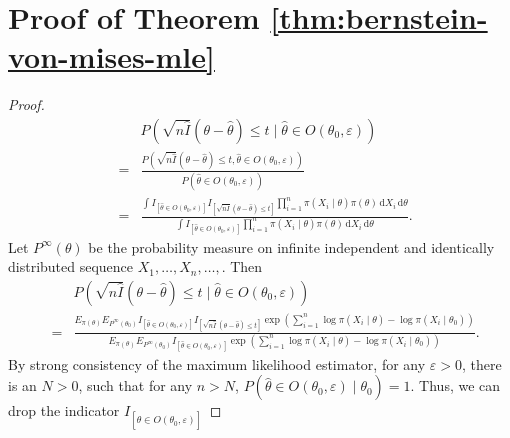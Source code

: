 \documentclass[oneside,english]{amsbook}
\numberwithin{section}{chapter}
\numberwithin{equation}{section}
\numberwithin{figure}{section}
\theoremstyle{plain}
\theoremstyle{plain}
\theoremstyle{definition}
\theoremstyle{plain}
\theoremstyle{plain}
\theoremstyle{remark}
\theoremstyle{definition}
\theoremstyle{definition}
\newcommand{\diff}{\,\mathrm{d}}
\begin{document}
\section{\label{sec:proof-thm-1}Proof of Theorem \ref{thm:bernstein-von-mises-mle}}
\begin{proof}
\begin{eqnarray*}
 &  & P\left(\sqrt{n\hat{I}}\left(\theta-\hat{\theta}\right)\le t\mid\hat{\theta}\in O\left(\theta_{0},\varepsilon\right)\right)\\
 & = & \frac{P\left(\sqrt{n\hat{I}}\left(\theta-\hat{\theta}\right)\le t,\hat{\theta}\in O\left(\theta_{0},\varepsilon\right)\right)}{P\left(\hat{\theta}\in O\left(\theta_{0},\varepsilon\right)\right)}\\
 & = & \frac{\int I_{\left[\hat{\theta}\in O\left(\theta_{0},\varepsilon\right)\right]}I_{\left[\sqrt{n\hat{I}}\left(\theta-\hat{\theta}\right)\le t\right]}\prod_{i=1}^{n}\pi\left(X_{i}\mid\theta\right)\pi\left(\theta\right)\diff X_{i}\diff\theta}{\int I_{\left[\hat{\theta}\in O\left(\theta_{0},\varepsilon\right)\right]}\prod_{i=1}^{n}\pi\left(X_{i}\mid\theta\right)\pi\left(\theta\right)\diff X_{i}\diff\theta}.
\end{eqnarray*}
Let $P^{\infty}\left(\theta\right)$ be the probability measure on
infinite independent and identically distributed sequence $X_{1},\ldots,X_{n},\ldots,$.
Then 
\begin{eqnarray}
 &  & P\left(\sqrt{n\hat{I}}\left(\theta-\hat{\theta}\right)\le t\mid\hat{\theta}\in O\left(\theta_{0},\varepsilon\right)\right)\nonumber \\
 & = & \frac{E_{\pi\left(\theta\right)}E_{P^{\infty}\left(\theta_{0}\right)}I_{\left[\hat{\theta}\in O\left(\theta_{0},\varepsilon\right)\right]}I_{\left[\sqrt{n\hat{I}}\left(\theta-\hat{\theta}\right)\le t\right]}\exp\left(\sum_{i=1}^{n}\log\pi\left(X_{i}\mid\theta\right)-\log\pi\left(X_{i}\mid\theta_{0}\right)\right)}{E_{\pi\left(\theta\right)}E_{P^{\infty}\left(\theta_{0}\right)}I_{\left[\hat{\theta}\in O\left(\theta_{0},\varepsilon\right)\right]}\exp\left(\sum_{i=1}^{n}\log\pi\left(X_{i}\mid\theta\right)-\log\pi\left(X_{i}\mid\theta_{0}\right)\right)}.\label{eq:post-change-measure}
\end{eqnarray}
By strong consistency of the maximum likelihood estimator, for any
$\varepsilon>0$, there is an $N>0$, such that for any $n>N$, $P\left(\hat{\theta}\in O\left(\theta_{0},\varepsilon\right)\mid\theta_{0}\right)=1$.
Thus, we can drop the indicator $I_{\left[\hat{\theta}\in O\left(\theta_{0},\varepsilon\right)\right]}$

\end{proof}
\end{document}

